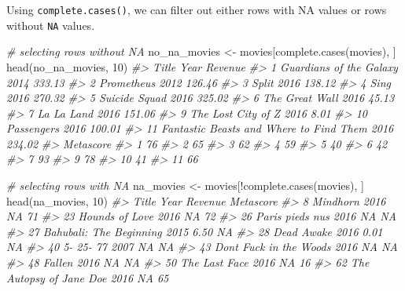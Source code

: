 \documentclass[
]{book}
\newenvironment{Shaded}{\begin{snugshade}}{\end{snugshade}}
\newcommand{\CommentTok}[1]{\textcolor[rgb]{0.56,0.35,0.01}{\textit{#1}}}
\newcommand{\DecValTok}[1]{\textcolor[rgb]{0.00,0.00,0.81}{#1}}
\newcommand{\FunctionTok}[1]{\textcolor[rgb]{0.00,0.00,0.00}{#1}}
\newcommand{\NormalTok}[1]{#1}
\newcommand{\OtherTok}[1]{\textcolor[rgb]{0.56,0.35,0.01}{#1}}
\newcommand{\SpecialCharTok}[1]{\textcolor[rgb]{0.00,0.00,0.00}{#1}}
\begin{document}
Using \texttt{complete.cases()}, we can filter out either rows with NA values or rows without \texttt{NA} values.

\begin{Shaded}
\begin{Highlighting}[]
\CommentTok{\# selecting rows without NA}
\NormalTok{no\_na\_movies }\OtherTok{\textless{}{-}}\NormalTok{ movies[}\FunctionTok{complete.cases}\NormalTok{(movies), ]}
\FunctionTok{head}\NormalTok{(no\_na\_movies, }\DecValTok{10}\NormalTok{)}
\CommentTok{\#\textgreater{}                                      Title Year Revenue}
\CommentTok{\#\textgreater{} 1                  Guardians of the Galaxy 2014  333.13}
\CommentTok{\#\textgreater{} 2                               Prometheus 2012  126.46}
\CommentTok{\#\textgreater{} 3                                    Split 2016  138.12}
\CommentTok{\#\textgreater{} 4                                     Sing 2016  270.32}
\CommentTok{\#\textgreater{} 5                            Suicide Squad 2016  325.02}
\CommentTok{\#\textgreater{} 6                           The Great Wall 2016   45.13}
\CommentTok{\#\textgreater{} 7                               La La Land 2016  151.06}
\CommentTok{\#\textgreater{} 9                       The Lost City of Z 2016    8.01}
\CommentTok{\#\textgreater{} 10                              Passengers 2016  100.01}
\CommentTok{\#\textgreater{} 11 Fantastic Beasts and Where to Find Them 2016  234.02}
\CommentTok{\#\textgreater{}    Metascore}
\CommentTok{\#\textgreater{} 1         76}
\CommentTok{\#\textgreater{} 2         65}
\CommentTok{\#\textgreater{} 3         62}
\CommentTok{\#\textgreater{} 4         59}
\CommentTok{\#\textgreater{} 5         40}
\CommentTok{\#\textgreater{} 6         42}
\CommentTok{\#\textgreater{} 7         93}
\CommentTok{\#\textgreater{} 9         78}
\CommentTok{\#\textgreater{} 10        41}
\CommentTok{\#\textgreater{} 11        66}

\CommentTok{\# selecting rows with NA}
\NormalTok{na\_movies }\OtherTok{\textless{}{-}}\NormalTok{ movies[}\SpecialCharTok{!}\FunctionTok{complete.cases}\NormalTok{(movies), ]}
\FunctionTok{head}\NormalTok{(na\_movies, }\DecValTok{10}\NormalTok{)}
\CommentTok{\#\textgreater{}                      Title Year Revenue Metascore}
\CommentTok{\#\textgreater{} 8                 Mindhorn 2016      NA        71}
\CommentTok{\#\textgreater{} 23          Hounds of Love 2016      NA        72}
\CommentTok{\#\textgreater{} 26         Paris pieds nus 2016      NA        NA}
\CommentTok{\#\textgreater{} 27 Bahubali: The Beginning 2015    6.50        NA}
\CommentTok{\#\textgreater{} 28              Dead Awake 2016    0.01        NA}
\CommentTok{\#\textgreater{} 40               5{-} 25{-} 77 2007      NA        NA}
\CommentTok{\#\textgreater{} 43 Don\textquotesingle{}t Fuck in the Woods 2016      NA        NA}
\CommentTok{\#\textgreater{} 48                  Fallen 2016      NA        NA}
\CommentTok{\#\textgreater{} 50           The Last Face 2016      NA        16}
\CommentTok{\#\textgreater{} 62 The Autopsy of Jane Doe 2016      NA        65}
\end{Highlighting}
\end{Shaded}
\end{document}
